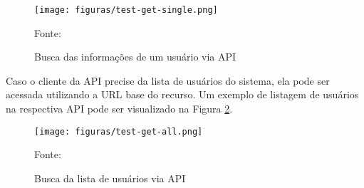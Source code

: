 \begin{figure}[H]
	\centering
	\caption{Busca das informações de um usuário via \ac{API}}
	\texttt{[image: figuras/test-get-single.png]}

	\label{fig:test-get-single}
	\footnotesize Fonte: \fonteOAutor
\end{figure}

Caso o cliente da \ac{API} precise da lista de usuários do sistema, ela pode
ser acessada utilizando a \ac{URL} base do recurso. Um exemplo de listagem
de usuários na respectiva \ac{API} pode ser visualizado na Figura
\ref{fig:test-get-all}.

\begin{figure}[H]
	\centering
	\caption{Busca da lista de usuários via \ac{API}}
	\texttt{[image: figuras/test-get-all.png]}

	\label{fig:test-get-all}
	\footnotesize Fonte: \fonteOAutor
\end{figure}
